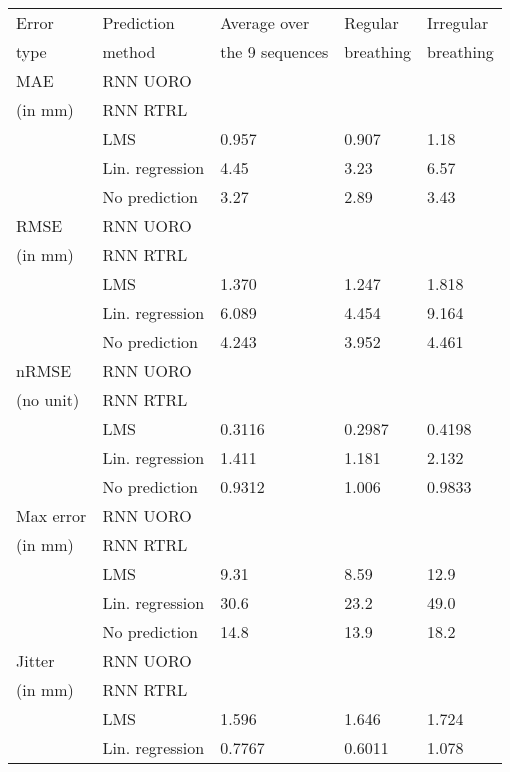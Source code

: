 \documentclass[twocolumn,a4paper]{svjour3} \sloppy          \smartqed
\begin{document}
\begin{table*}[tb!]
\normalsize
\setlength{\tabcolsep}{8pt}
\begin{center}
\begin{tabular}{lllll}
\hline
Error     &  Prediction & Average over   & Regular   & Irregular \\
type      &  method     & the 9 sequences  & breathing & breathing\protect\footnotemark \\
\hline \hline
MAE       & RNN UORO        &  &  &  \\
(in mm)   & RNN RTRL        &  &  &  \\
          & LMS             & 0.957 & 0.907 & 1.18 \\
          & Lin. regression & 4.45 & 3.23 & 6.57 \\
          & No prediction   & 3.27 & 2.89 & 3.43 \\
\hline               
RMSE      & RNN UORO        &  &  &  \\
(in mm)   & RNN RTRL        &  &  &  \\
          & LMS             & 1.370 & 1.247 & 1.818 \\
          & Lin. regression & 6.089 & 4.454 & 9.164 \\
          & No prediction   & 4.243 & 3.952 & 4.461 \\    
\hline
nRMSE     & RNN UORO        &  &  &  \\
(no unit) & RNN RTRL        &  &  &  \\
          & LMS             & 0.3116 & 0.2987 & 0.4198 \\
          & Lin. regression & 1.411 & 1.181 & 2.132 \\
          & No prediction   & 0.9312 & 1.006 & 0.9833 \\    
\hline
Max error & RNN UORO        &  &  &  \\
(in mm)   & RNN RTRL        &  &  &  \\
          & LMS             & 9.31 & 8.59 & 12.9 \\
          & Lin. regression & 30.6 & 23.2 & 49.0 \\
          & No prediction   & 14.8 & 13.9 & 18.2 \\   
\hline
Jitter    & RNN UORO        &  &  &  \\
(in mm)   & RNN RTRL        &  &  &  \\
          & LMS             & 1.596 & 1.646 & 1.724 \\
          & Lin. regression & 0.7767 & 0.6011 & 1.078 \\

\end{tabular}
\end{center}
\end{table*}
\end{document}
